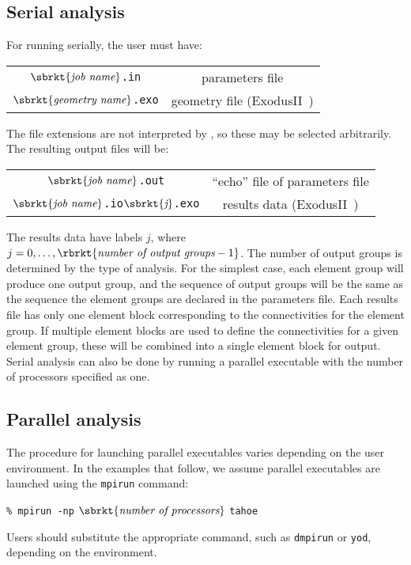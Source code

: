 \subsection{Serial analysis}
\label{sect.serial.analysis}
For running serially, the user must have:
\begin{center}
\begin{tabular}[c]{c c}
\parbox[b]{3.0in}{\raggedleft $\sbrkt{\textit{job name}}$\texttt{.in}} 
&\parbox[b]{3.0in}{parameters file}\\
\parbox[b]{3.0in}{\raggedleft $\sbrkt{\textit{geometry name}}$\texttt{.exo}} 
&\parbox[b]{3.0in}{geometry file (\textsf{ExodusII}~\cite{ExodusII})}\\
\end{tabular}
\end{center}
The file extensions are not interpreted by \tahoe, so these may be selected
arbitrarily.  The resulting output files will be:
\begin{center}
\begin{tabular}[c]{c c}
 \parbox[b]{3.0in}{\raggedleft $\sbrkt{\textit{job name}}$\texttt{.out}} 
&\parbox[b]{3.0in}{``echo'' file of parameters file}\\
 \parbox[b]{3.0in}{\raggedleft $\sbrkt{\textit{job name}}$\texttt{.io}$\sbrkt{\textit{j}}$\texttt{.exo}} 
&\parbox[b]{3.0in}{results data (\textsf{ExodusII}~\cite{ExodusII})}\\
\end{tabular}
\end{center}
The results data have labels $j$,  
where $j = 0,\ldots,\rbrkt{\textit{number of output groups} - 1}$.
The number of output groups is determined by the type of analysis. 
For the simplest case, each element group will produce one output group,
and the sequence of output groups will be the same as the sequence the
element groups are declared in the parameters file.  Each results file has
only one element block corresponding to the connectivities for the element
group.  If multiple element blocks are used to define the connectivities
for a given element group, these will be combined into a single element
block for output.  Serial analysis can also be done by running a parallel
executable with the number of processors specified as one.

\subsection{Parallel analysis}
\label{sect.parallel.analysis}
The procedure for launching parallel executables varies depending on the
user environment. In the examples that follow, we assume parallel
executables are launched using the \texttt{mpirun} command:
\begin{center}
	\texttt{\% mpirun -np} $\sbrkt{\textit{number of processors}}$ \texttt{tahoe}
\end{center}
Users should substitute the appropriate command, such as \texttt{dmpirun} 
or \texttt{yod}, depending on the environment.

